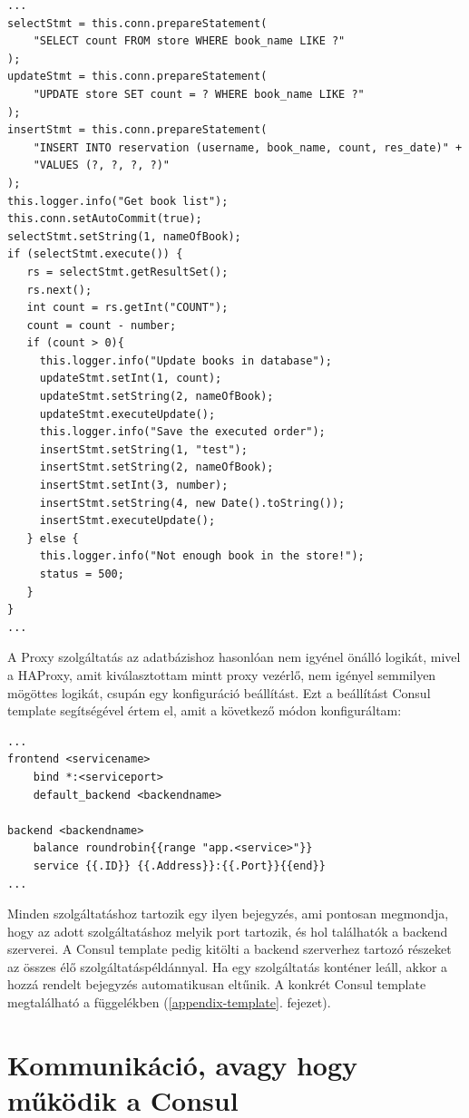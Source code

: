 \documentclass[11pt,magyar,a4paper,twoside,]{report}
\begin{document}
\begin{verbatim}
...
selectStmt = this.conn.prepareStatement(
    "SELECT count FROM store WHERE book_name LIKE ?"
);
updateStmt = this.conn.prepareStatement(
    "UPDATE store SET count = ? WHERE book_name LIKE ?"
);
insertStmt = this.conn.prepareStatement(
    "INSERT INTO reservation (username, book_name, count, res_date)" +
    "VALUES (?, ?, ?, ?)"
);
this.logger.info("Get book list");
this.conn.setAutoCommit(true);
selectStmt.setString(1, nameOfBook);
if (selectStmt.execute()) {
   rs = selectStmt.getResultSet();
   rs.next();
   int count = rs.getInt("COUNT");
   count = count - number;
   if (count > 0){
     this.logger.info("Update books in database");
     updateStmt.setInt(1, count);
     updateStmt.setString(2, nameOfBook);
     updateStmt.executeUpdate();
     this.logger.info("Save the executed order");
     insertStmt.setString(1, "test");
     insertStmt.setString(2, nameOfBook);
     insertStmt.setInt(3, number);
     insertStmt.setString(4, new Date().toString());
     insertStmt.executeUpdate();
   } else {
     this.logger.info("Not enough book in the store!");
     status = 500;     
   }
}
...
\end{verbatim}

A Proxy szolgáltatás az adatbázishoz hasonlóan nem igyénel önálló
logikát, mivel a HAProxy, amit kiválasztottam mintt proxy vezérlő, nem
igényel semmilyen mögöttes logikát, csupán egy konfiguráció beállítást.
Ezt a beállítást Consul template segítségével értem el, amit a következő
módon konfiguráltam:

\begin{verbatim}
...
frontend <servicename>
    bind *:<serviceport>
    default_backend <backendname>

backend <backendname>
    balance roundrobin{{range "app.<service>"}}
    service {{.ID}} {{.Address}}:{{.Port}}{{end}}
...
\end{verbatim}

Minden szolgáltatáshoz tartozik egy ilyen bejegyzés, ami pontosan
megmondja, hogy az adott szolgáltatáshoz melyik port tartozik, és hol
találhatók a backend szerverei. A Consul template pedig kitölti a
backend szerverhez tartozó részeket az összes élő
szolgáltatáspéldánnyal. Ha egy szolgáltatás konténer leáll, akkor a
hozzá rendelt bejegyzés automatikusan eltűnik. A konkrét Consul template
megtalálható a függelékben (\ref{appendix-template}. fejezet).

\section{Kommunikáció, avagy hogy működik a
Consul}\label{kommunikuxe1ciuxf3-avagy-hogy-mux171kuxf6dik-a-consul}
\end{document}

